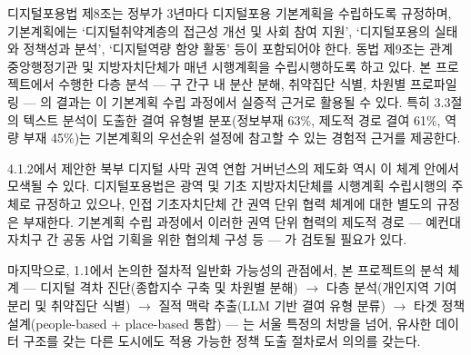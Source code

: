디지털포용법 제8조는 정부가 3년마다 디지털포용 기본계획을 수립하도록 규정하며, 기본계획에는 `디지털취약계층의 접근성 개선 및 사회 참여 지원', `디지털포용의 실태와 정책성과 분석', `디지털역량 함양 활동' 등이 포함되어야 한다. 동법 제9조는 관계 중앙행정기관 및 지방자치단체가 매년 시행계획을 수립\textperiodcentered{}시행하도록 하고 있다. 본 프로젝트에서 수행한 다층 분석 --- 구 간\textperiodcentered{}구 내 분산 분해, 취약집단 식별, 차원별 프로파일링 --- 의 결과는 이 기본계획 수립 과정에서 실증적 근거로 활용될 수 있다. 특히 3.3절의 텍스트 분석이 도출한 결여 유형별 분포(정보부재 63\%, 제도적 경로 결여 61\%, 역량 부재 45\%)는 기본계획의 우선순위 설정에 참고할 수 있는 경험적 근거를 제공한다.

4.1.2에서 제안한 북부 디지털 사막 권역 연합 거버넌스의 제도화 역시 이 체계 안에서 모색될 수 있다. 디지털포용법은 광역 및 기초 지방자치단체를 시행계획 수립\textperiodcentered{}시행의 주체로 규정하고 있으나, 인접 기초자치단체 간 권역 단위 협력 체계에 대한 별도의 규정은 부재한다. 기본계획 수립 과정에서 이러한 권역 단위 협력의 제도적 경로 --- 예컨대 자치구 간 공동 사업 기획을 위한 협의체 구성 등 --- 가 검토될 필요가 있다.

마지막으로, 1.1에서 논의한 절차적 일반화 가능성의 관점에서, 본 프로젝트의 분석 체계 --- 디지털 격차 진단(종합지수 구축 및 차원별 분해) $\rightarrow$ 다층 분석(개인\textperiodcentered{}지역 기여 분리 및 취약집단 식별) $\rightarrow$ 질적 맥락 추출(LLM 기반 결여 유형 분류) $\rightarrow$ 타겟 정책 설계(people-based + place-based 통합) --- 는 서울 특정의 처방을 넘어, 유사한 데이터 구조를 갖는 다른 도시에도 적용 가능한 정책 도출 절차로서 의의를 갖는다.
